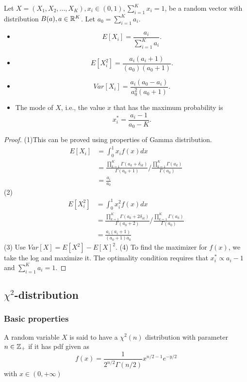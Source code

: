\begin{refsection}
\begin{lemma}\label{ch:theory-of-statistics:th:propertyDirichletDistribution}
	Let $X = (X_1,X_2,...,X_K),x_i\in (0,1), \sum_{i=1}^{K} x_i = 1$, be a random vector  with distribution $B(a),a\in \mathbb{R}^K$. Let $a_0 = \sum_{i=1}^{K}a_i$.
	\begin{itemize}
		\item $$E[X_i] = \frac{a_i}{\sum_{i=1}^{K} a_i}.$$
		\item $$E[X^2_i] = \frac{a_i(a_i+1)}{(a_0)(a_0+1)}.$$
		\item 
		$$Var[X_i] = \frac{a_i(a_0-a_i)}{a_0^2(a_0+1)}.$$
		\item The mode of $X$, i.e., the value $x$ that has the maximum probability is
		$$x^*_i = \frac{a_i-1}{a_0-K}.$$
	\end{itemize}
\end{lemma}
\begin{proof}
	(1)This can be proved using properties of Gamma distribution.
	\begin{align*}
	E[X_i] &= \int_0^1 x_if(x)dx \\
	&=  \frac{\prod_{k=1}^K \Gamma(a_k + \delta_{ik})}{\Gamma(a_0+1)}/\frac{\prod_{k=1}^K \Gamma(a_k)}{\Gamma(a_0)}\\
	&= \frac{a_i}{a_0}
	\end{align*}	
	(2) \begin{align*}
	E[X_i^2] &= \int_0^1 x^2_if(x)dx \\
&=  \frac{\prod_{k=1}^K \Gamma(a_k + 2\delta_{ik})}{\Gamma(a_0+2)}/\frac{\prod_{k=1}^K \Gamma(a_k)}{\Gamma(a_0)}\\
&= \frac{a_i(a_i+1)}{(a_0+1)a_0}  
	\end{align*}
	(3) Use $Var[X] = E[X^2] - E[X]^2.$
	(4) To find the maximizer for $f(x)$, we take the log and maximize it. The optimality condition requires that $x_i^*\propto a_i-1$ and $\sum_{i=1}^{K}a_i=1$.
\end{proof}

\subsection{$\chi^2$-distribution}
\subsubsection{Basic properties}
\begin{definition}
A random variable $X$ is said to have a $\chi^2(n)$ distribution with parameter $n\in \mathbb{Z}_+$ if it has pdf given as
$$f(x) = \frac{1}{2^{n/2}\Gamma(n/2)}x^{n/2-1}e^{-y/2}$$
with $x\in (0,+\infty)$	
\end{definition}


\end{refsection}
